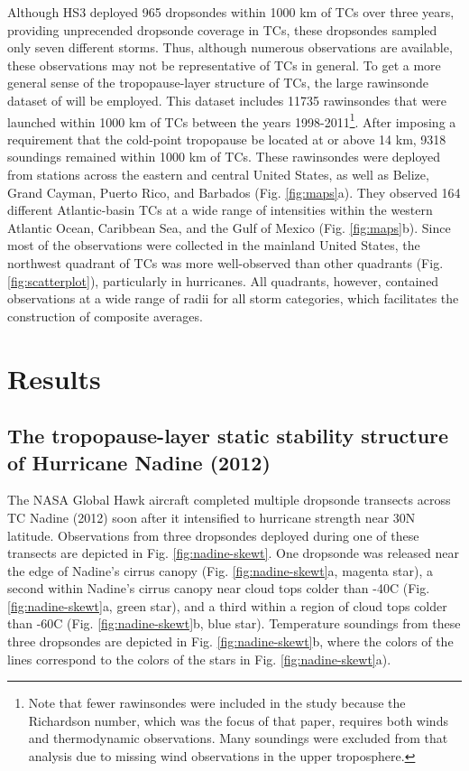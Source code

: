 Although HS3 deployed 965 dropsondes within 1000 km of TCs over three years, providing unprecended dropsonde coverage in TCs, these dropsondes sampled only seven different storms.
Thus, although numerous observations are available, these observations may not be representative of TCs in general.
To get a more general sense of the tropopause-layer structure of TCs, the large rawinsonde dataset of \cite{DuranMolinari2016} will be employed.
This dataset includes 11735 rawinsondes that were launched within 1000 km of TCs between the years 1998-2011\footnote{Note that fewer rawinsondes were included in the \cite{DuranMolinari2016} study because the Richardson number, which was the focus of that paper, requires both winds and thermodynamic observations. Many soundings were excluded from that analysis due to missing wind observations in the upper troposphere.}.
After imposing a requirement that the cold-point tropopause be located at or above 14 km, 9318 soundings remained within 1000 km of TCs.
These rawinsondes were deployed from stations across the eastern and central United States, as well as Belize, Grand Cayman, Puerto Rico, and Barbados (Fig. \ref{fig:maps}a).
They observed 164 different Atlantic-basin TCs at a wide range of intensities within the western Atlantic Ocean, Caribbean Sea, and the Gulf of Mexico (Fig. \ref{fig:maps}b).
Since most of the observations were collected in the mainland United States, the northwest quadrant of TCs was more well-observed than other quadrants (Fig. \ref{fig:scatterplot}), particularly in hurricanes.
All quadrants, however, contained observations at a wide range of radii for all storm categories, which facilitates the construction of composite averages.

\section{Results}
\subsection{The tropopause-layer static stability structure of Hurricane Nadine (2012)}
The NASA Global Hawk aircraft completed multiple dropsonde transects across TC Nadine (2012) soon after it intensified to hurricane strength near 30\textdegree{}N latitude.
Observations from three dropsondes deployed during one of these transects are depicted in Fig. \ref{fig:nadine-skewt}.
One dropsonde was released near the edge of Nadine's cirrus canopy (Fig. \ref{fig:nadine-skewt}a, magenta star), a second within Nadine's cirrus canopy near cloud tops colder than -40\textdegree{}C (Fig. \ref{fig:nadine-skewt}a, green star), and a third within a region of cloud tops colder than -60\textdegree{}C (Fig. \ref{fig:nadine-skewt}b, blue star).
Temperature soundings from these three dropsondes are depicted in Fig. \ref{fig:nadine-skewt}b, where the colors of the lines correspond to the colors of the stars in Fig. \ref{fig:nadine-skewt}a).

